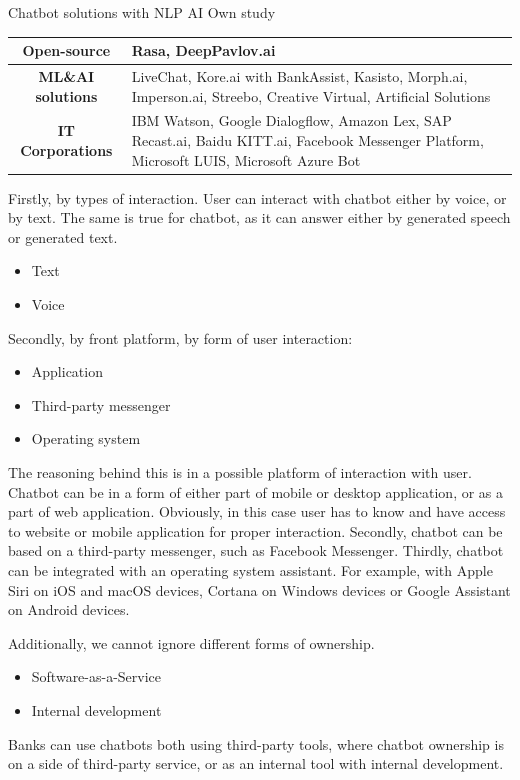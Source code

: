 \mttable
{Chatbot solutions with NLP AI}
{Own study}
{
    \begin{tabular}{|c|p{10cm}|}
        \hline
        \textbf{Open-source} & Rasa, DeepPavlov.ai \\
        \hline
        \textbf{ML\&AI solutions} & LiveChat, Kore.ai with BankAssist, Kasisto, \newline Morph.ai, Imperson.ai, Streebo, \newline Creative Virtual, Artificial Solutions \\
        \hline
        \textbf{IT Corporations} & IBM Watson, Google Dialogflow, Amazon Lex, \newline SAP Recast.ai, Baidu KITT.ai, \newline Facebook Messenger Platform, \newline Microsoft LUIS, Microsoft Azure Bot \\
        \hline
    \end{tabular}
}

Firstly, by types of interaction.
User can interact with chatbot either by voice, or by text.
The same is true for chatbot, as it can answer either by generated speech or generated text.
\begin{itemize}
    \item Text
    \item Voice 
\end{itemize}

Secondly, by front platform, by form of user interaction:
\begin{itemize}
    \item Application 
    \item Third-party messenger
    \item Operating system
\end{itemize}

The reasoning behind this is in a possible platform of interaction with user.
Chatbot can be in a form of either part of mobile or desktop application, or as a part of web application.
Obviously, in this case user has to know and have access to website or mobile application for proper interaction.
Secondly, chatbot can be based on a third-party messenger, such as Facebook Messenger.
Thirdly, chatbot can be integrated with an operating system assistant.
For example, with Apple Siri on iOS and macOS devices, Cortana on Windows devices or Google Assistant on Android devices.

Additionally, we cannot ignore different forms of ownership.
\begin{itemize}
    \item Software-as-a-Service
    \item Internal development
\end{itemize}
Banks can use chatbots both using third-party tools, where chatbot ownership is on a side of third-party service, or as an internal tool with internal development. 

